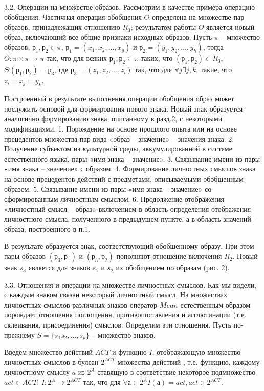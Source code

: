 3.2. Операции на множестве образов. Рассмотрим в качестве примера операцию обобщения.
Частичная операция обобщения $\Theta$ определена на множестве пар образов, принадлежащих отношению $R_3$; результатом работы $\Theta$ является новый образ, включающий все общие признаки исходных образов. Пусть $\pi$ – множество образов, $р_1,р_2\in\pi$, $р_1=(x_1,x_2,\dots,x_g)$ и $р_2=(y_1,y_2,\dots,y_h)$, тогда $\Theta:\pi\times\pi\rightarrow\pi$ так, что для всяких $р_1,р_2\in\pi$ таких, что $(р_1,р_2)\in R_3$, $\Theta(р_1,р_2)=р_3$, где $р_3=(z_1,z_2,\dots,z_l)$ так, что для $\forall j\exists j,k$, такие, что $z_i=x_j=y_k$.

Построенный в результате выполнения операции обобщения образ может послужить основой для формирования нового знака. Новый знак образуется аналогично формированию знака, описанному в разд.2, с некоторыми модификациями.
1. Порождение на основе прошлого опыта или на основе прецедентов множества пар вида «образ – значение» – значения знака.
2. Получение субъектом из культурной среды, аккумулированной в системе естественного языка, пары «имя знака – значение».
3. Связывание имени из пары «имя знака – значение» с образом.
4. Формирование личностных смыслов знака на основе прецедентов действий с предметами, описываемыми обобщенным образом.
5. Связывание имени из пары «имя знака – значение» со сформированным личностным смыслом.
6. Продолжение отображения «личностный смысл – образ» включением в область определения отображения личностного смысла, полученного в предыдущем пункте, а в область значений – образа, построенного в п.1.

В результате образуется знак, соответствующий обобщенному образу. При этом пары образов $(р_3,р_1)$ и $(р_3,р_2)$ пополняют отношение включения $R_2$. Новый знак $s_3$ является для знаков $s_1$ и $s_2$ их обобщением по образам (рис. 2).

3.3. Отношения и операции на множестве личностных смыслов. Как мы видели, с каждым знаком связан некоторый личностный смысл.
На множествах личностных смыслов различных знаков оператор $Mean$ естественным образом порождает отношения поглощения, противопоставления и агглютинации (т.е. склеивания, присоединения) смыслов. Определим эти отношения. Пусть по-прежнему $S=\{s_1 s_2,\dots,s_k\}$ – множество знаков.

Введём множество действий $ACT$ и функцию $I$, отображающую множество личностных смыслов в булеан $2^{ACT}$ множества действий \cite{Osipov2000}, т.е. функцию, каждому личностному смыслу $a$ из $2^A$ ставящую в соответствие некоторое подмножество $act\in ACT$: $I:2^A\rightarrow 2^{ACT}$ так, что для $\forall а\in 2^A I(а)=act,act\in 2^{ACT}$.

